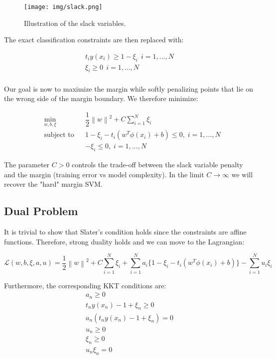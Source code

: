 \documentclass[twoside]{article}
\newcommand{\norm}[1]{\left\lVert #1 \right\rVert}
\begin{document}
\begin{figure}[h]
\caption{Illustration of the slack variables.}
\centering
\texttt{[image: img/slack.png]}
\end{figure}

The exact classification constraints are then replaced with:

\begin{align*}
       t_{i} y(x_{i}) \geq 1 - \xi_{i} \ \ i=1,\ldots,N \\        
        \xi_{i} \geq 0 \ \ i=1,\ldots,N\\ 
\end{align*}

Our goal is now to maximize the margin while softly penalizing points that lie on the wrong side of the margin boundary. We therefore minimize:

\begin{equation*}
\begin{aligned}
& \underset{w,b,\xi}{\text{min}}
& & \dfrac{1}{2} \norm{w}^2 + C \sum_{i=1}^{N} \xi_{i}\\
& \text{subject to}
& & 1 - \xi_{i} - t_{i} (w^T \phi(x_{i}) +b)  \leq 0, \; i = 1, \ldots, N \\
&&& - \xi_{i} \leq 0, \; i = 1, \ldots, N
\end{aligned}
\end{equation*}

The parameter $C > 0$ controls the trade-off between the slack variable penalty and the margin (training error vs model complexity). In the limit $C \xrightarrow{} \infty $ we will recover the "hard" margin SVM. 

\subsection{Dual Problem}
It is trivial to show that Slater's condition holds since the constraints are affine functions. Therefore, strong duality holds and we can move to the Lagrangian:

\begin{equation*}
    \mathcal{L}(w,b,\xi,a,u) = 
    \dfrac{1}{2} \norm{w}^2 + C \sum_{i=1}^{N} \xi_{i} + \sum_{i=1}^{N} a_{i} \{ 1 - \xi_{i} - t_{i} (w^T \phi(x_{i}) +b) \}
    - \sum_{i=1}^{N} u_{i}\xi_{i}
    \end{equation*}

Furthermore, the corresponding KKT conditions are:
\begin{align}
        a_{n} \geq 0 \\       
        t_{n}y(x_{n}) -1 +\xi_{n} \geq 0 \\
        a_{n}(t_{n}y(x_{n}) -1 +\xi_{n} ) = 0
        \\
        u_{n} \geq 0 \\
        \xi_{n} \geq 0 \\
        u_{n}\xi_{n} = 0
\end{align}
\end{document}
